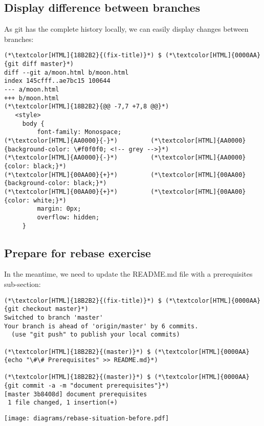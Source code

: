 \subsection{Display difference between branches}
\begin{frame}[fragile]
  \subslidetitle

  As git has the complete history locally, we can easily display changes between branches:

  \begin{lstlisting}
(*\textcolor[HTML]{18B2B2}{(fix-title)}*) $ (*\textcolor[HTML]{0000AA}{git diff master}*)
diff --git a/moon.html b/moon.html
index 145cfff..ae7bc15 100644
--- a/moon.html
+++ b/moon.html
(*\textcolor[HTML]{18B2B2}{@@ -7,7 +7,8 @@}*)
   <style>
     body {
         font-family: Monospace;
(*\textcolor[HTML]{AA0000}{-}*)         (*\textcolor[HTML]{AA0000}{background-color: \#f0f0f0; <!-- grey -->}*)
(*\textcolor[HTML]{AA0000}{-}*)         (*\textcolor[HTML]{AA0000}{color: black;}*)
(*\textcolor[HTML]{00AA00}{+}*)         (*\textcolor[HTML]{00AA00}{background-color: black;}*)
(*\textcolor[HTML]{00AA00}{+}*)         (*\textcolor[HTML]{00AA00}{color: white;}*)
         margin: 0px;
         overflow: hidden;
     }
\end{lstlisting}
\end{frame}

\subsection{Prepare for rebase exercise}
\begin{frame}[fragile]
  \subslidetitle

  In the meantime, we need to update the README.md file with a prerequisites sub-section:
  \begin{lstlisting}
(*\textcolor[HTML]{18B2B2}{(fix-title)}*) $ (*\textcolor[HTML]{0000AA}{git checkout master}*)
Switched to branch 'master'
Your branch is ahead of 'origin/master' by 6 commits.
  (use "git push" to publish your local commits)

(*\textcolor[HTML]{18B2B2}{(master)}*) $ (*\textcolor[HTML]{0000AA}{echo "\#\# Prerequisites" >> README.md}*)

(*\textcolor[HTML]{18B2B2}{(master)}*) $ (*\textcolor[HTML]{0000AA}{git commit -a -m "document prerequisites"}*)
[master 3b8408d] document prerequisites
 1 file changed, 1 insertion(+)
\end{lstlisting}

  \centerline{\texttt{[image: diagrams/rebase-situation-before.pdf]}}

\end{frame}

